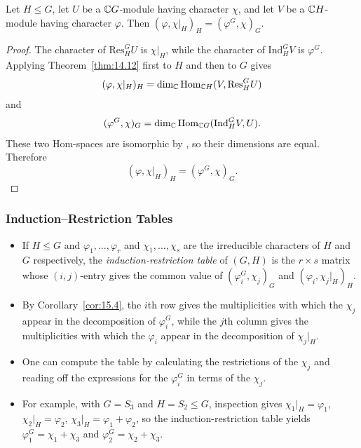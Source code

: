 \documentclass[../Odyssey_Project.tex]{subfiles}
\begin{document}
\begin{theorem}
\label{thm:16.2}
Let $H \leq G$, let $U$ be a $\mathbb{C} G$-module having character $\chi$, and let $V$ be a $\mathbb{C} H$-module having character $\varphi$. Then $(\varphi, \chi|_H)_H = (\varphi^G, \chi)_G$.
\end{theorem}

\begin{proof}
    The character of $\mathrm{Res}_H^G U$ is $\chi|_H$, while the character of $\mathrm{Ind}_H^G V$ is $\varphi^G$. Applying Theorem~\ref{thm:14.12} first to $H$ and then to $G$ gives
    \[
        (\varphi,\chi|_H)_H
        =
        \dim_{\mathbb{C}}\operatorname{Hom}_{\mathbb{C} H}(V,\mathrm{Res}_H^G U)
    \]
    and
    \[
        (\varphi^G,\chi)_G
        =
        \dim_{\mathbb{C}}\operatorname{Hom}_{\mathbb{C} G}(\mathrm{Ind}_H^G V,U).
    \]
    These two Hom-spaces are isomorphic by , so their dimensions are equal. Therefore
    \[
        (\varphi,\chi|_H)_H=(\varphi^G,\chi)_G.
    \]
\end{proof}

\subsubsection*{Induction--Restriction Tables}
\begin{itemize}
    \item If $H \leq G$ and $\varphi_1, \dots, \varphi_r$ and $\chi_1, \dots, \chi_s$ are the irreducible characters of $H$ and $G$ respectively, the \emph{induction-restriction table} of $(G, H)$ is the $r \times s$ matrix whose $(i,j)$-entry gives the common value of $(\varphi_i^G, \chi_j)_G$ and $(\varphi_i, \chi_j|_H)_H$.
    \item By Corollary~\ref{cor:15.4}, the $i$th row gives the multiplicities with which the $\chi_j$ appear in the decomposition of $\varphi_i^G$, while the $j$th column gives the multiplicities with which the $\varphi_i$ appear in the decomposition of $\chi_j|_H$.
    \item One can compute the table by calculating the restrictions of the $\chi_j$ and reading off the expressions for the $\varphi_i^G$ in terms of the $\chi_j$.
    \item For example, with $G = S_3$ and $H = S_2 \leq G$, inspection gives $\chi_1|_H = \varphi_1$, $\chi_2|_H = \varphi_2$, $\chi_3|_H = \varphi_1 + \varphi_2$, so the induction-restriction table yields $\varphi_1^G = \chi_1 + \chi_3$ and $\varphi_2^G = \chi_2 + \chi_3$.
\end{itemize}
\end{document}
